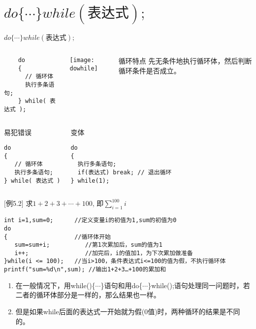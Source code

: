 \section{$do \{\cdots\} while(\text{表达式});$}

\begin{frame}{$do \{\cdots\} while(\text{表达式});$}
\vspace{-0.3cm}
\begin{columns}
	\begin{lstlisting} 
    do  
    {
      // 循环体
      执行多条语句;  
    } while( 表达式 );  
    \end{lstlisting}
	\texttt{[image: dowhile]}
	\begin{block}{循环特点}
		先无条件地执行循环体，然后判断循环条件是否成立。
	\end{block}
\end{columns}
\vspace{-0.2cm}
\begin{columns}
\begin{block}{易犯错误}
\begin{lstlisting} 
do  
{
   // 循环体
   执行多条语句;  
} while( 表达式 )
\end{lstlisting}
\end{block}
\begin{block}{变体}
\begin{lstlisting} 
do  
{
  执行多条语句;  
  if(表达式) break; // 退出循环  
} while(1);
\end{lstlisting}
\end{block}
\end{columns}
\end{frame}

\begin{frame}
$[$例5.2$]$ 求$1+2+3+\cdots+100$, 即$\sum\limits_{i=1}^{100}i$
\medskip
\begin{lstlisting}[frame=lines]
int i=1,sum=0;      //定义变量i的初值为1,sum的初值为0  
do     
{                   //循环体开始
   sum=sum+i;          //第1次累加后，sum的值为1
   i++;                //加完后，i的值加1，为下次累加做准备
}while(i <= 100);   //当i>100，条件表达式i<=100的值为假，不执行循环体
printf("sum=%d\n",sum); //输出1+2+3…+100的累加和                
\end{lstlisting}
\begin{enumerate}
	\setlength{\itemsep}{.2cm}
	\item 在一般情况下，用while()\{$\cdots$\}语句和用do\{$\cdots$\}while();语句处理同一问题时，若二者的循环体部分是一样的，那么结果也一样。
	\item 但是如果while后面的表达式一开始就为假(0值)时，两种循环的结果是不同的。
\end{enumerate}
\end{frame}

